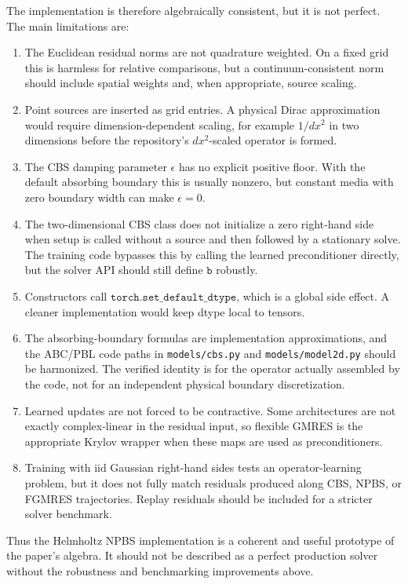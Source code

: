 \documentclass[11pt]{article}
\begin{document}
The implementation is therefore algebraically consistent, but it is not
perfect.  The main limitations are:
\begin{enumerate}
\item The Euclidean residual norms are not quadrature weighted.  On a fixed
grid this is harmless for relative comparisons, but a continuum-consistent
norm should include spatial weights and, when appropriate, source scaling.
\item Point sources are inserted as grid entries.  A physical Dirac
approximation would require dimension-dependent scaling, for example
\(1/dx^2\) in two dimensions before the repository's \(dx^2\)-scaled operator
is formed.
\item The CBS damping parameter \(\epsilon\) has no explicit positive floor.
With the default absorbing boundary this is usually nonzero, but constant
media with zero boundary width can make \(\epsilon=0\).
\item The two-dimensional CBS class does not initialize a zero right-hand side
when setup is called without a source and then followed by a stationary solve.
The training code bypasses this by calling the learned preconditioner directly,
but the solver API should still define \(\texttt{b}\) robustly.
\item Constructors call \(\texttt{torch.set\_default\_dtype}\), which is a
global side effect.  A cleaner implementation would keep dtype local to tensors.
\item The absorbing-boundary formulas are implementation approximations, and
the ABC/PBL code paths in \texttt{models/cbs.py} and
\texttt{models/model2d.py} should be harmonized.  The verified identity is for
the operator actually assembled by the code, not for an independent physical
boundary discretization.
\item Learned updates are not forced to be contractive.  Some architectures are
not exactly complex-linear in the residual input, so flexible GMRES is the
appropriate Krylov wrapper when these maps are used as preconditioners.
\item Training with iid Gaussian right-hand sides tests an operator-learning
problem, but it does not fully match residuals produced along CBS, NPBS, or
FGMRES trajectories.  Replay residuals should be included for a stricter solver
benchmark.
\end{enumerate}

Thus the Helmholtz NPBS implementation is a coherent and useful prototype of
the paper's algebra.  It should not be described as a perfect production solver
without the robustness and benchmarking improvements above.
\end{document}

